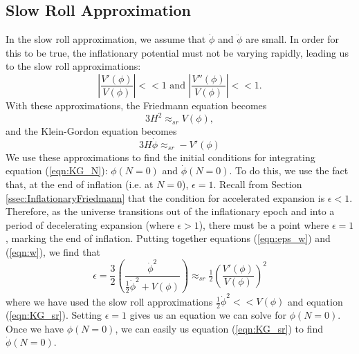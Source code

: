 \documentclass[onecolumn,apj]{emulateapj}
\def\half{\tfrac{1}{2}}
\begin{document}
\subsection{Slow Roll Approximation}
\label{ssec:SlowRoll}
In the slow roll approximation, we assume that $\dot \phi$ and $\ddot \phi$ are small. In order for this to be true, the inflationary potential must not be varying rapidly, leading us to the slow roll approximations:
\begin{equation}
\left | \frac{V'(\phi)}{V(\phi)} \right | <<1 \text{\ \ \ and\ \ \ } \left | \frac{V''(\phi)}{V(\phi)} \right | <<1 .
\label{eqn:SlowRollApprox}
\end{equation}
With these approximations, the Friedmann equation becomes
\begin{equation}
3 H^2 \approx_{sr} V(\phi),
\label{eqn:Friedmann_sr}
\end{equation}
and the Klein-Gordon equation becomes
\begin{equation}
3 H \dot \phi \approx_{sr} -V'(\phi)
\label{eqn:KG_sr}
\end{equation}
We use these approximations to find the initial conditions for integrating equation (\ref{eqn:KG_N}): $\phi(N=0)$ and $\dot \phi(N=0)$. To do this, we use the fact that, at the end of inflation (i.e. at $N=0$), $\epsilon = 1$. Recall from Section \ref{ssec:InflationaryFriedmann} that the condition for accelerated expansion is $\epsilon<1$. Therefore, as the universe transitions out of the inflationary epoch and into a period of decelerating expansion (where $\epsilon>1$), there must be a point where $\epsilon=1$, marking the end of inflation. Putting together equations (\ref{eqn:eps_w}) and (\ref{eqn:w}), we find that 
\begin{equation}
\epsilon = \frac{3}{2} \left ( \frac{\dot \phi^2}{\half \dot \phi^2 + V(\phi)} \right ) \approx_{sr} \half \left (\frac{V'(\phi)}{V(\phi)} \right ) ^2 
\end{equation}
where we have used the slow roll approximations $\half \dot \phi^2 << V(\phi)$ and equation (\ref{eqn:KG_sr}). Setting $\epsilon=1$ gives us an equation we can solve for $\phi(N=0)$. Once we have $\phi(N=0)$, we can easily us equation (\ref{eqn:KG_sr}) to find $\dot \phi(N=0)$. 


{}
\end{document}
